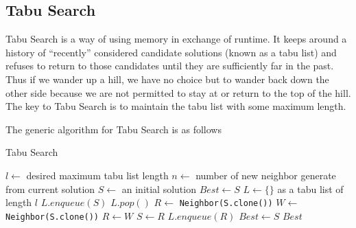         \subsection{Tabu Search}
                Tabu Search is a way of using memory in exchange of runtime. It keeps around a history of ``recently'' considered candidate solutions (known as a tabu list) and refuses to return to those candidates until they are sufficiently far in the past. Thus if we wander up a hill, we have no choice but to wander back down the other side because we are not permitted to stay at or return to the top of the hill. The key to Tabu Search is to maintain the tabu list with some maximum length. 

                The generic algorithm for Tabu Search is as follows

                \begin{algorithm}[!htp]
                    \centering
                    \caption{Tabu Search}
                    \begin{algorithmic}[1]
                        \State $l \gets$ desired maximum tabu list length
                        \State $n \gets$ number of new neighbor generate from current solution
                        \State $S \gets$ an initial solution
                        \State $Best \gets S$
                        \State $L \gets \{\}$ as a tabu list of length $l$
                        \State $L.enqueue(S)$
                                \State $L.pop()$
                            \EndWhile
                            \State $R \gets$ \texttt{Neighbor(S.clone())}
                                \State $W \gets$ \texttt{Neighbor(S.clone())}
                                    \State $R \gets W$
                                \EndIf
                            \EndFor
                                \State $S \gets R$
                                \State $L.enqueue(R)$
                            \EndIf
                                \State $Best \gets S$
                            \EndIf
                        \EndWhile
                        \State \Return $Best$
                    \end{algorithmic}
                \end{algorithm}

